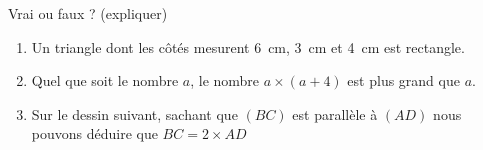 
\begin{exercice}\label{exo2smath-0154}

    \begin{multicols}{2}
    Vrai ou faux ? (expliquer)
    \begin{enumerate}
        \item
            Un triangle dont les côtés mesurent \SI{6}{\centi\meter}, \SI{3}{\centi\meter} et \SI{4}{\centi\meter} est rectangle.
        \item
            Quel que soit le nombre \( a\), le nombre \( a\times (a+4)\) est plus grand que \( a\).
        \item   \label{ItemITNOooXrgyJt}
            Sur le dessin suivant, sachant que \( (BC)\) est parallèle à \( (AD)\) nous pouvons déduire que \( BC=2\times AD\) 

    \end{enumerate}
    \columnbreak
            \begin{center}
                
            \end{center}
    \end{multicols}

\end{exercice}
